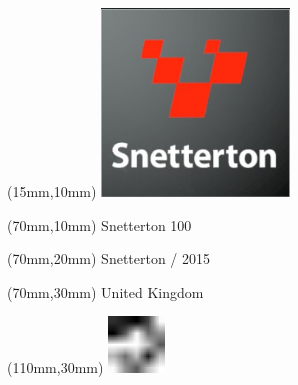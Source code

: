 \null\newpage
\begin{textblock*}{50mm}(15mm,10mm)%
\includegraphics[width=50mm]{LG/2015-05-20_00095.png}
\end{textblock*}
\begin{textblock*}{130mm}(70mm,10mm)%
{\fontsize{20}{20}\selectfont Snetterton 100}\\
\end{textblock*}
\begin{textblock*}{120mm}(70mm,20mm)%
{\fontsize{16}{16}\selectfont Snetterton / 2015}\\
\end{textblock*}
\begin{textblock*}{120mm}(70mm,30mm)%
{\fontsize{12}{12}\selectfont United Kingdom}
\end{textblock*}
\begin{textblock*}{30mm}(110mm,30mm)%
\centering
\includegraphics[height=15mm]{icons/fa-rotate-left.pdf}
\end{textblock*}
